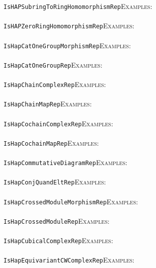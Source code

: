 \documentclass[a4paper,11pt]{report}
\begin{document}
{{ \texttt{IsHAPSubringToRingHomomorphismRep}{\nobreakspace}{\nobreakspace}{\nobreakspace}{\nobreakspace}\textsc{Examples:} \\
 \\
 \texttt{IsHAPZeroRingHomomorphismRep}{\nobreakspace}{\nobreakspace}{\nobreakspace}{\nobreakspace}\textsc{Examples:} \\
 \\
 \texttt{IsHapCatOneGroupMorphismRep}{\nobreakspace}{\nobreakspace}{\nobreakspace}{\nobreakspace}\textsc{Examples:} \\
 \\
 \texttt{IsHapCatOneGroupRep}{\nobreakspace}{\nobreakspace}{\nobreakspace}{\nobreakspace}\textsc{Examples:} \\
 \\
 \texttt{IsHapChainComplexRep}{\nobreakspace}{\nobreakspace}{\nobreakspace}{\nobreakspace}\textsc{Examples:} \\
 \\
 \texttt{IsHapChainMapRep}{\nobreakspace}{\nobreakspace}{\nobreakspace}{\nobreakspace}\textsc{Examples:} \\
 \\
 \texttt{IsHapCochainComplexRep}{\nobreakspace}{\nobreakspace}{\nobreakspace}{\nobreakspace}\textsc{Examples:} \\
 \\
 \texttt{IsHapCochainMapRep}{\nobreakspace}{\nobreakspace}{\nobreakspace}{\nobreakspace}\textsc{Examples:} \\
 \\
 \texttt{IsHapCommutativeDiagramRep}{\nobreakspace}{\nobreakspace}{\nobreakspace}{\nobreakspace}\textsc{Examples:} \\
 \\
 \texttt{IsHapConjQuandEltRep}{\nobreakspace}{\nobreakspace}{\nobreakspace}{\nobreakspace}\textsc{Examples:} \\
 \\
 \texttt{IsHapCrossedModuleMorphismRep}{\nobreakspace}{\nobreakspace}{\nobreakspace}{\nobreakspace}\textsc{Examples:} \\
 \\
 \texttt{IsHapCrossedModuleRep}{\nobreakspace}{\nobreakspace}{\nobreakspace}{\nobreakspace}\textsc{Examples:} \\
 \\
 \texttt{IsHapCubicalComplexRep}{\nobreakspace}{\nobreakspace}{\nobreakspace}{\nobreakspace}\textsc{Examples:} \\
 \\
 \texttt{IsHapEquivariantCWComplexRep}{\nobreakspace}{\nobreakspace}{\nobreakspace}{\nobreakspace}\textsc{Examples:} \\
}}
\end{document}
